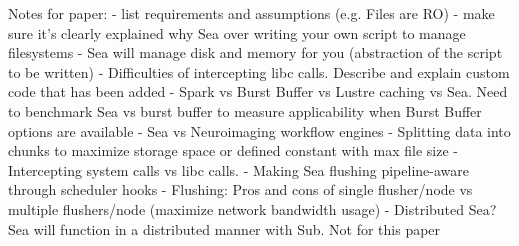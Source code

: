 Notes for paper:
- list requirements and assumptions (e.g. Files are RO)
- make sure it's clearly explained why Sea over writing your own script to manage filesystems
    - Sea will manage disk and memory for you (abstraction of the script to be written)
    - Difficulties of intercepting libc calls. Describe and explain custom code that has been added
- Spark vs Burst Buffer vs Lustre caching vs Sea. Need to benchmark Sea vs burst buffer to measure
  applicability when Burst Buffer options are available
- Sea vs Neuroimaging workflow engines
- Splitting data into chunks to maximize storage space or defined constant with max file size
- Intercepting system calls vs libc calls.
- Making Sea flushing pipeline-aware through scheduler hooks
- Flushing: Pros and cons of single flusher/node vs multiple flushers/node (maximize network bandwidth usage)
- Distributed Sea? Sea will function in a distributed manner with Sub. Not for this paper

